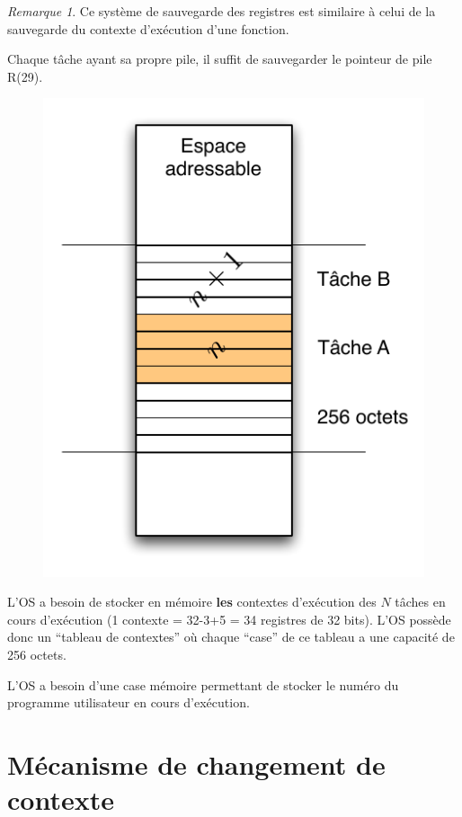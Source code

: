 \documentclass[11pt,english,french]{scrreprt}
\theoremstyle{remark}
\newtheorem*{rem*}{Remarque}
\theoremstyle{definition}
\begin{document}
\begin{rem*}
	Ce système de sauvegarde des registres est similaire à celui de la sauvegarde du contexte d'exécution d'une fonction.
	
	Chaque tâche ayant sa propre pile, il suffit de sauvegarder le pointeur de pile R(29).
\end{rem*}
\begin{figure}
	\center
	\vspace{-40pt}
	\includegraphics[scale=.5]{diagrammes/taches}
	\vspace{-35pt}
\end{figure}
L'OS a besoin de stocker en mémoire \textbf{les} contextes d'exécution des $N$ tâches en cours d'exécution (1 contexte = 32-3+5 = 34 registres de 32 bits). L'OS possède donc un ``tableau de contextes'' où  chaque ``case'' de ce tableau a une capacité de 256 octets.

L'OS a besoin d'une case mémoire permettant de stocker le numéro du programme utilisateur en cours d'exécution.


\section{Mécanisme de changement de contexte} %
\end{document}
